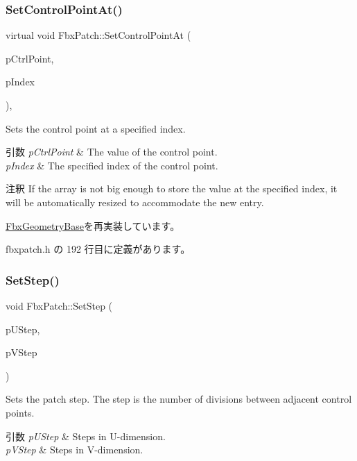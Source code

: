 \subsubsection{\texorpdfstring{Set\+Control\+Point\+At()}{SetControlPointAt()}}
{\footnotesize\ttfamily virtual void Fbx\+Patch\+::\+Set\+Control\+Point\+At (\begin{DoxyParamCaption}\item[{const \hyperlink{class_fbx_vector4}{Fbx\+Vector4} \&}]{p\+Ctrl\+Point,  }\item[{int}]{p\+Index }\end{DoxyParamCaption})\hspace{0.3cm}{\ttfamily [inline]}, {\ttfamily [virtual]}}

Sets the control point at a specified index. 
\begin{DoxyParams}{引数}
{\em p\+Ctrl\+Point} & The value of the control point. \\
\hline
{\em p\+Index} & The specified index of the control point.\\
\hline
\end{DoxyParams}
\begin{DoxyRemark}{注釈}
If the array is not big enough to store the value at the specified index, it will be automatically resized to accommodate the new entry. 
\end{DoxyRemark}


\hyperlink{class_fbx_geometry_base_ab2d5567b073e6b9f4feb5bb428fa99e4}{Fbx\+Geometry\+Base}を再実装しています。



 fbxpatch.\+h の 192 行目に定義があります。

\mbox{\label{class_fbx_patch_a9b1fca6dfff6bf62472528b5a12ea987}} 
\subsubsection{\texorpdfstring{Set\+Step()}{SetStep()}}
{\footnotesize\ttfamily void Fbx\+Patch\+::\+Set\+Step (\begin{DoxyParamCaption}\item[{int}]{p\+U\+Step,  }\item[{int}]{p\+V\+Step }\end{DoxyParamCaption})}

Sets the patch step. The step is the number of divisions between adjacent control points. 
\begin{DoxyParams}{引数}
{\em p\+U\+Step} & Steps in U-\/dimension. \\
\hline
{\em p\+V\+Step} & Steps in V-\/dimension. \\
\hline
\end{DoxyParams}
\mbox{\label{class_fbx_patch_abe0a63e804147816c6d6b7733b7de6dd}} 
